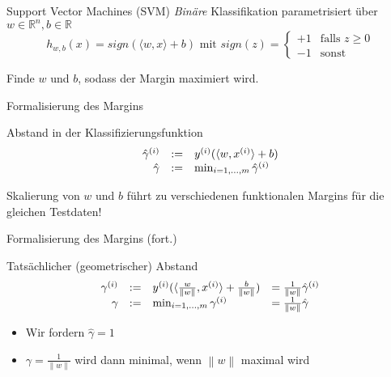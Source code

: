 \documentclass[xcolor={dvipsnames,svgnames}]{beamer}
\newcommand{\inner}[2]{\langle{} #1, #2 \rangle{}}
\newcommand{\norm}[1]{\left\lVert#1\right\rVert}
\begin{document}
\begin{frame}{Support Vector Machines (SVM)}
  \textit{Binäre} Klassifikation parametrisiert über $w \in \mathbb{R}^n, b \in
  \mathbb{R}$
  \[
    h_{w,b}(x) = sign(\inner{w}{x} + b) 
    \text{ mit } 
    sign(z) = \begin{cases}
      +1 & \text{falls } z \geq 0 \\
      -1 & \text{sonst}
    \end{cases}
  \]

  Finde $w$ und $b$, sodass der Margin maximiert wird.
\end{frame}

\begin{frame}{Formalisierung des Margins}
  \begin{definition}
    Abstand in der Klassifizierungsfunktion
    \[
      \begin{array}{r@{\quad:=\quad}l}
        \hat{\gamma}^{(i)} & y^{(i)}(\inner{w}{x^{(i)}}+b) \\
        \hat{\gamma} & \min_{i=1,\ldots,m}\hat{\gamma}^{(i)}
      \end{array}
    \]
  \end{definition}
  Skalierung von $w$ und $b$ führt zu verschiedenen funktionalen Margins für
  die gleichen Testdaten!
\end{frame}

\begin{frame}{Formalisierung des Margins (fort.)}
  \begin{definition}
    Tatsächlicher (geometrischer) Abstand
    \[
      \begin{array}{r@{\quad:=\quad}ll}
        \gamma^{(i)} & y^{(i)}(\inner{\frac{w}{\norm{w}}}{x^{(i)}}+\frac{b}{\norm{w}}) & = \frac{1}{\norm{w}} \hat{\gamma}^{(i)} \\
        \gamma & \min_{i=1,\ldots,m}\gamma^{(i)} & = \frac{1}{\norm{w}} \hat{\gamma}
      \end{array}
    \]
  \end{definition}

  \begin{itemize}
  \item Wir fordern $\hat{\gamma} = 1$
  \item $\gamma = \frac{1}{\norm{w}}$ wird dann minimal, wenn $\norm{w}$ maximal wird
  \end{itemize}
  
\end{frame}
\end{document}
